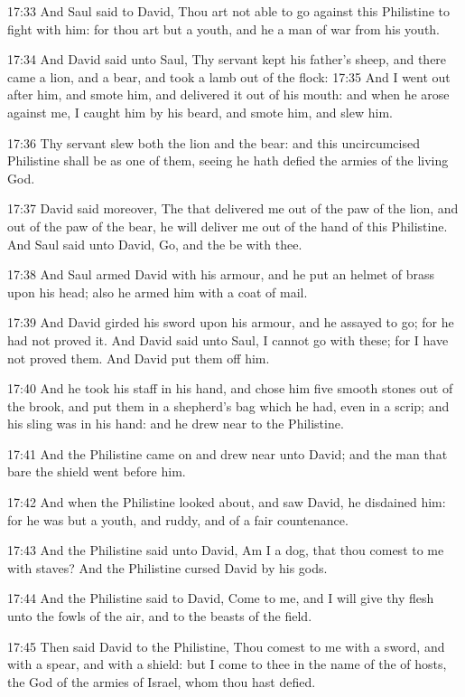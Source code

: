 17:33 And Saul said to David, Thou art not able to go against this Philistine to fight with him: for thou art but a youth, and he a man of war from his youth.

17:34 And David said unto Saul, Thy servant kept his father's sheep, and there came a lion, and a bear, and took a lamb out of the flock: 17:35 And I went out after him, and smote him, and delivered it out of his mouth: and when he arose against me, I caught him by his beard, and smote him, and slew him.

17:36 Thy servant slew both the lion and the bear: and this uncircumcised Philistine shall be as one of them, seeing he hath defied the armies of the living God.

17:37 David said moreover, The \LORD that delivered me out of the paw of the lion, and out of the paw of the bear, he will deliver me out of the hand of this Philistine. And Saul said unto David, Go, and the \LORD be with thee.

17:38 And Saul armed David with his armour, and he put an helmet of brass upon his head; also he armed him with a coat of mail.

17:39 And David girded his sword upon his armour, and he assayed to go; for he had not proved it. And David said unto Saul, I cannot go with these; for I have not proved them. And David put them off him.

17:40 And he took his staff in his hand, and chose him five smooth stones out of the brook, and put them in a shepherd's bag which he had, even in a scrip; and his sling was in his hand: and he drew near to the Philistine.

17:41 And the Philistine came on and drew near unto David; and the man that bare the shield went before him.

17:42 And when the Philistine looked about, and saw David, he disdained him: for he was but a youth, and ruddy, and of a fair countenance.

17:43 And the Philistine said unto David, Am I a dog, that thou comest to me with staves? And the Philistine cursed David by his gods.

17:44 And the Philistine said to David, Come to me, and I will give thy flesh unto the fowls of the air, and to the beasts of the field.

17:45 Then said David to the Philistine, Thou comest to me with a sword, and with a spear, and with a shield: but I come to thee in the name of the \LORD of hosts, the God of the armies of Israel, whom thou hast defied.

